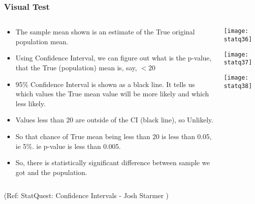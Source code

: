 \begin{frame}[fragile]\frametitle{Visual Test}

\begin{columns}
    \begin{column}[T]{0.6\linewidth}
	\begin{itemize}
	
	\item The sample mean shown is an estimate of the True  original population mean.
	\item Using Confidence Interval, we can figure out what is the p-value, that the True (population) mean is, say, $<20$
	\item 95\% Confidence Interval is shown as a black line. It tells us which values the True mean value will be more likely and which less likely.
	\item Values less than 20 are outside of the CI (black line), so Unlikely.
	\item So that chance of True mean being less than 20 is less than 0.05, ie 5\%. ie p-value is less than 0.005.
	\item So, there is statistically significant difference between sample we got and the population.
	\end{itemize}

    \end{column}
    \begin{column}[T]{0.4\linewidth}
      \begin{center}
      \texttt{[image: statq36]}
	  
	  \texttt{[image: statq37]}

	  \texttt{[image: statq38]}
	  
	  	\end{center}
    \end{column}

  \end{columns}
  
  
 
\tiny{(Ref: StatQuest: Confidence Intervals - Josh Starmer )}
\end{frame}

